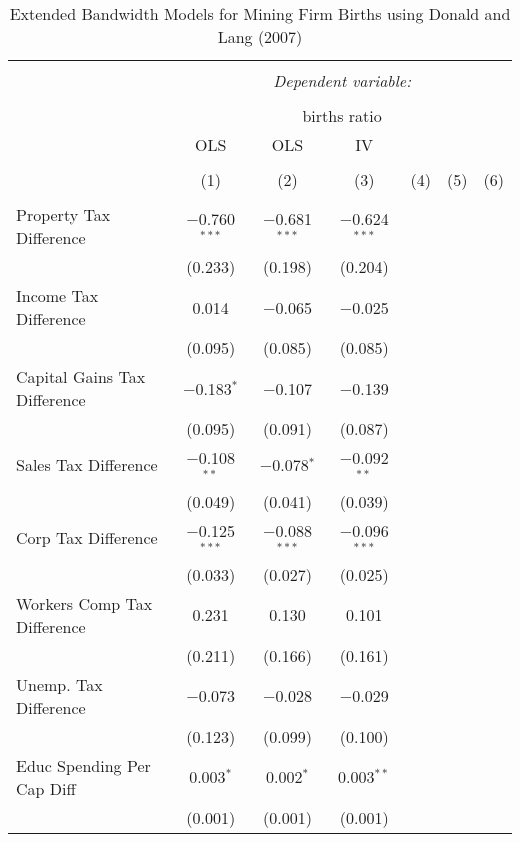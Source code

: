 
\begin{table}[!htbp] \centering 
  \caption{Extended Bandwidth Models for  Mining Firm Births using Donald and Lang (2007)} 
  \label{} 
\begin{tabular}{@{\extracolsep{5pt}}lcccccc} 
\\[-1.8ex]\hline 
\hline \\[-1.8ex] 
 & \multicolumn{6}{c}{\textit{Dependent variable:}} \\ 
\cline{2-7} 
\\[-1.8ex] & \multicolumn{6}{c}{births ratio} \\ 
 & OLS & OLS & IV &  &  &  \\ 
\\[-1.8ex] & (1) & (2) & (3) & (4) & (5) & (6)\\ 
\hline \\[-1.8ex] 
 Property Tax Difference & $-$0.760$^{***}$ & $-$0.681$^{***}$ & $-$0.624$^{***}$ &  &  &  \\ 
  & (0.233) & (0.198) & (0.204) &  &  &  \\ 
  Income Tax Difference & 0.014 & $-$0.065 & $-$0.025 &  &  &  \\ 
  & (0.095) & (0.085) & (0.085) &  &  &  \\ 
  Capital Gains Tax Difference & $-$0.183$^{*}$ & $-$0.107 & $-$0.139 &  &  &  \\ 
  & (0.095) & (0.091) & (0.087) &  &  &  \\ 
  Sales Tax Difference & $-$0.108$^{**}$ & $-$0.078$^{*}$ & $-$0.092$^{**}$ &  &  &  \\ 
  & (0.049) & (0.041) & (0.039) &  &  &  \\ 
  Corp Tax Difference & $-$0.125$^{***}$ & $-$0.088$^{***}$ & $-$0.096$^{***}$ &  &  &  \\ 
  & (0.033) & (0.027) & (0.025) &  &  &  \\ 
  Workers Comp Tax Difference & 0.231 & 0.130 & 0.101 &  &  &  \\ 
  & (0.211) & (0.166) & (0.161) &  &  &  \\ 
  Unemp. Tax Difference & $-$0.073 & $-$0.028 & $-$0.029 &  &  &  \\ 
  & (0.123) & (0.099) & (0.100) &  &  &  \\ 
  Educ Spending Per Cap Diff & 0.003$^{*}$ & 0.002$^{*}$ & 0.003$^{**}$ &  &  &  \\ 
  & (0.001) & (0.001) & (0.001) &  &  &  \\ 

\end{tabular}
\end{table}
